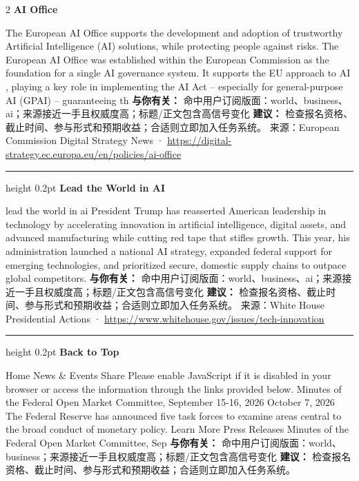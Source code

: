 \documentclass[10.5pt]{ctexart}
\begin{document}
\begin{multicols}{2}
{\large\bfseries AI Office}\par
The European AI Office supports the development and adoption of trustworthy Artificial Intelligence (AI) solutions, while protecting people against risks. The European AI Office was established within the European Commission as the foundation for a single AI governance system. It supports the EU approach to AI , playing a key role in implementing the AI Act – especially for general-purpose AI (GPAI) – guaranteeing th
\textbf{与你有关：} 命中用户订阅版面：world、business、ai；来源接近一手且权威度高；标题/正文包含高信号变化
\textbf{建议：} 检查报名资格、截止时间、参与形式和预期收益；合适则立即加入任务系统。
{\footnotesize\color{ormuted} 来源：European Commission Digital Strategy News · \url{https://digital-strategy.ec.europa.eu/en/policies/ai-office}}
\vspace{2mm}
\hrule height 0.2pt
\vspace{2mm}
{\large\bfseries Lead the World in AI}\par
lead the world in ai President Trump has reasserted American leadership in technology by accelerating innovation in artificial intelligence, digital assets, and advanced manufacturing while cutting red tape that stifles growth. This year, his administration launched a national AI strategy, expanded federal support for emerging technologies, and prioritized secure, domestic supply chains to outpace global competitors.
\textbf{与你有关：} 命中用户订阅版面：world、business、ai；来源接近一手且权威度高；标题/正文包含高信号变化
\textbf{建议：} 检查报名资格、截止时间、参与形式和预期收益；合适则立即加入任务系统。
{\footnotesize\color{ormuted} 来源：White House Presidential Actions · \url{https://www.whitehouse.gov/issues/tech-innovation}}
\vspace{2mm}
\hrule height 0.2pt
\vspace{2mm}
{\large\bfseries Back to Top}\par
Home News \& Events Share Please enable JavaScript if it is disabled in your browser or access the information through the links provided below. Minutes of the Federal Open Market Committee, September 15-16, 2026 October 7, 2026 The Federal Reserve has announced five task forces to examine areas central to the broad conduct of monetary policy. Learn More Press Releases Minutes of the Federal Open Market Committee, Sep
\textbf{与你有关：} 命中用户订阅版面：world、business；来源接近一手且权威度高；标题/正文包含高信号变化
\textbf{建议：} 检查报名资格、截止时间、参与形式和预期收益；合适则立即加入任务系统。

\end{multicols}
\end{document}
